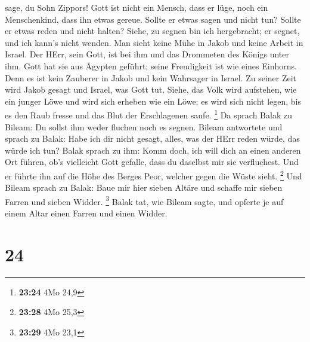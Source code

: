 sage, du Sohn Zippors!  Gott ist nicht ein Mensch, dass
er lüge, noch ein Menschenkind, dass ihn etwas gereue. Sollte er etwas
sagen und nicht tun? Sollte er etwas reden und nicht halten?
 Siehe, zu segnen bin ich hergebracht; er segnet, und ich
kann's nicht wenden.  Man sieht keine Mühe in Jakob und
keine Arbeit in Israel. Der HErr, sein Gott, ist bei ihm und das
Drommeten des Königs unter ihm.  Gott hat sie aus Ägypten
geführt; seine Freudigkeit ist wie eines Einhorns.  Denn
es ist kein Zauberer in Jakob und kein Wahrsager in Israel. Zu seiner
Zeit wird Jakob gesagt und Israel, was Gott tut.  Siehe,
das Volk wird aufstehen, wie ein junger Löwe und wird sich erheben wie
ein Löwe; es wird sich nicht legen, bis es den Raub fresse und das Blut
der Erschlagenen saufe. \footnote{\textbf{23:24} 4Mo 24,9}
 Da sprach Balak zu Bileam: Du sollst ihm weder fluchen
noch es segnen.  Bileam antwortete und sprach zu Balak:
Habe ich dir nicht gesagt, alles, was der HErr reden würde, das würde
ich tun?  Balak sprach zu ihm: Komm doch, ich will dich
an einen anderen Ort führen, ob's vielleicht Gott gefalle, dass du
daselbst mir sie verfluchest.  Und er führte ihn auf die
Höhe des Berges Peor, welcher gegen die Wüste sieht. \footnote{\textbf{23:28}
  4Mo 25,3}  Und Bileam sprach zu Balak: Baue mir hier
sieben Altäre und schaffe mir sieben Farren und sieben Widder.
\footnote{\textbf{23:29} 4Mo 23,1}  Balak tat, wie Bileam
sagte, und opferte je auf einem Altar einen Farren und einen Widder.

\hypertarget{section-23}{%
\section{24}\label{section-23}}

